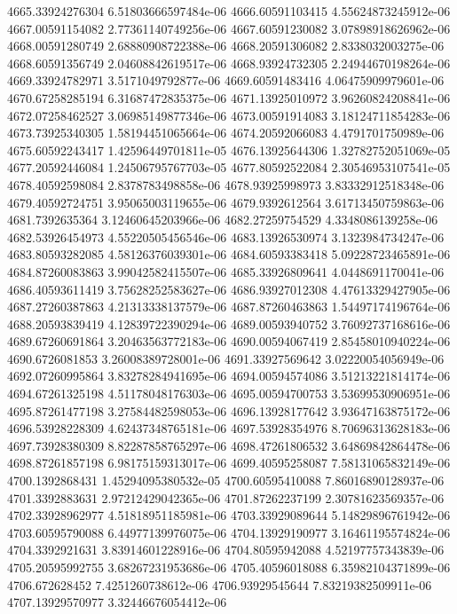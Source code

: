 {4665.33924276304 6.51803666597484e-06
4666.60591103415 4.55624873245912e-06
4667.00591154082 2.77361140749256e-06
4667.60591230082 3.07898918626962e-06
4668.00591280749 2.68880908722388e-06
4668.20591306082 2.8338032003275e-06
4668.60591356749 2.04608842619517e-06
4668.93924732305 2.24944670198264e-06
4669.33924782971 3.5171049792877e-06
4669.60591483416 4.06475909979601e-06
4670.67258285194 6.31687472835375e-06
4671.13925010972 3.96260824208841e-06
4672.07258462527 3.06985149877346e-06
4673.00591914083 3.18124711854283e-06
4673.73925340305 1.58194451065664e-06
4674.20592066083 4.4791701750989e-06
4675.60592243417 1.42596449701811e-05
4676.13925644306 1.32782752051069e-05
4677.20592446084 1.24506795767703e-05
4677.80592522084 2.30546953107541e-05
4678.40592598084 2.8378783498858e-06
4678.93925998973 3.83332912518348e-06
4679.40592724751 3.95065003119655e-06
4679.9392612564 3.61713450759863e-06
4681.7392635364 3.12460645203966e-06
4682.27259754529 4.3348086139258e-06
4682.53926454973 4.55220505456546e-06
4683.13926530974 3.1323984734247e-06
4683.80593282085 4.58126376039301e-06
4684.60593383418 5.09228723465891e-06
4684.87260083863 3.99042582415507e-06
4685.33926809641 4.0448691170041e-06
4686.40593611419 3.75628252583627e-06
4686.93927012308 4.47613329427905e-06
4687.27260387863 4.21313338137579e-06
4687.87260463863 1.54497174196764e-06
4688.20593839419 4.12839722390294e-06
4689.00593940752 3.76092737168616e-06
4689.67260691864 3.20463563772183e-06
4690.00594067419 2.85458010940224e-06
4690.6726081853 3.26008389728001e-06
4691.33927569642 3.02220054056949e-06
4692.07260995864 3.83278284941695e-06
4694.00594574086 3.51213221814174e-06
4694.67261325198 4.51178048176303e-06
4695.00594700753 3.53699530906951e-06
4695.87261477198 3.27584482598053e-06
4696.13928177642 3.93647163875172e-06
4696.53928228309 4.62437348765181e-06
4697.53928354976 8.70696313628183e-06
4697.73928380309 8.82287858765297e-06
4698.47261806532 3.64869842864478e-06
4698.87261857198 6.98175159313017e-06
4699.40595258087 7.58131065832149e-06
4700.1392868431 1.45294095380532e-05
4700.60595410088 7.86016890128937e-06
4701.3392883631 2.97212429042365e-06
4701.87262237199 2.30781623569357e-06
4702.33928962977 4.51818951185981e-06
4703.33929089644 5.14829896761942e-06
4703.60595790088 6.44977139976075e-06
4704.13929190977 3.16461195574824e-06
4704.3392921631 3.83914601228916e-06
4704.80595942088 4.52197757343839e-06
4705.20595992755 3.68267231953686e-06
4705.40596018088 6.35982104371899e-06
4706.672628452 7.4251260738612e-06
4706.93929545644 7.83219382509911e-06
4707.13929570977 3.32446676054412e-06
}
